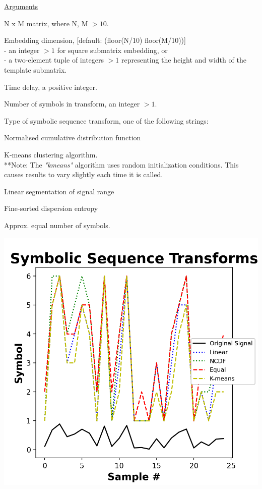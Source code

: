 \documentclass[12pt, a4paper, titlepage, openany]{book}
\begin{document}
\noindent \ul{Arguments}
\begin{description}[labelsep=1cm, labelwidth=2cm, nosep,,style=multiline,leftmargin=3cm]\footnotesize
\item[\texttt{Mat}]		N x M matrix,  where N, M $> 10$.
\item[\texttt{m}]		Embedding dimension, [default: (floor(N/10) floor(M/10))]\\
						- an integer $> 1$ for square submatrix embedding, or\\
						- a two-element tuple of integers $> 1$ representing the height and width of the template submatrix.
\item[\texttt{tau}]		Time delay, a positive integer.
\item[\texttt{c}]		Number of symbols in transform, an integer $> 1$.
\item[\texttt{Typex}]	Type of symbolic sequence transform, one of the following strings:
	\begin{description}[labelsep=5em, labelwidth=8em, nosep,style=multiline,leftmargin=3cm]
		\item[\texttt{"ncdf"}]		Normalised cumulative distribution function  \cite{Disp1}		
		\item[\texttt{"kmeans"}] 	K-means clustering algorithm.\\
		**Note: The \textit{"kmeans"} algorithm uses random initialization conditions.
		 This causes results to vary slightly each time it is called.
		\item[\texttt{"linear"}]	Linear segmentation of signal range 
		\item[\texttt{"finesort"}]	Fine-sorted dispersion entropy \cite{Disp4}
		\item[\texttt{"equal"}]		Approx. equal number of symbols.
		\item[]		\includegraphics[scale=.75]{Disp1.png}

\end{description}
\end{description}
\end{document}
